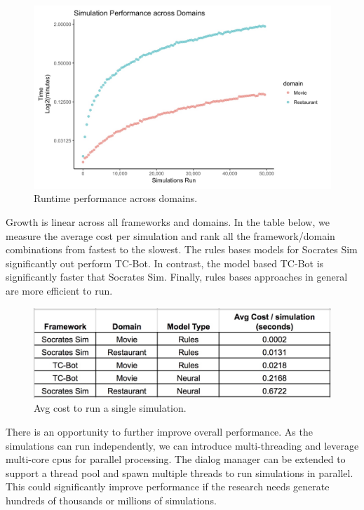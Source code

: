   \begin{figure}[h!]
 	\label{fig:perf_cd_test}
 	\includegraphics[width=\linewidth]{diagrams/domain_perf.jpeg}
 	\caption{ Runtime performance across domains.}
 \end{figure}

Growth is linear across all frameworks and domains. In the table below, we measure the average cost per simulation and rank all the framework/domain combinations from fastest to the slowest. The rules bases models for Socrates Sim significantly out perform TC-Bot. In contrast, the model based TC-Bot is significantly faster that Socrates Sim. Finally, rules bases approaches in general are more efficient to run. 

\begin{figure}[h!]
	\centering
	\includegraphics[width=\linewidth]{diagrams/avg_cost.jpeg}	
	\caption{ Avg cost to run a single simulation.}
	\label{fig:avg_cost}
\end{figure}

 There is an opportunity to further improve overall performance. As the simulations can run independently, we can introduce multi-threading and leverage multi-core cpus for parallel processing. The dialog manager can be extended to support a thread pool and spawn multiple threads to run simulations in parallel. This could significantly improve performance if the research needs generate hundreds of thousands or millions of simulations.  

